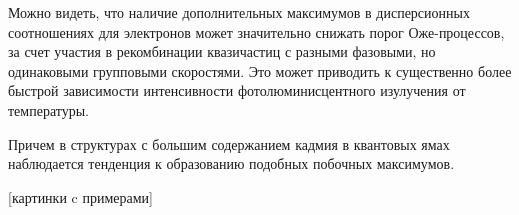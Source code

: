 \documentclass[../main.tex]{subfiles}
\begin{document}
\begin{figure}[h!]
\begin{minipage}[h]{0.3\linewidth}
\begin{center}
                \end{center}
            \end{minipage}
        \end{figure}

        Можно видеть, что наличие дополнительных максимумов в дисперсионных соотношениях для электронов
        может значительно снижать порог Оже-процессов, за счет участия в рекомбинации квазичастиц с разными фазовыми,
        но одинаковыми групповыми скоростями. Это может приводить к существенно более быстрой зависимости
        интенсивности фотолюминисцентного изулучения от температуры.

        Причем в структурах с большим содержанием кадмия в квантовых ямах наблюдается тенденция к образованию
        подобных побочных максимумов. 


        [картинки c примерами]
    \newpage
\end{document}
